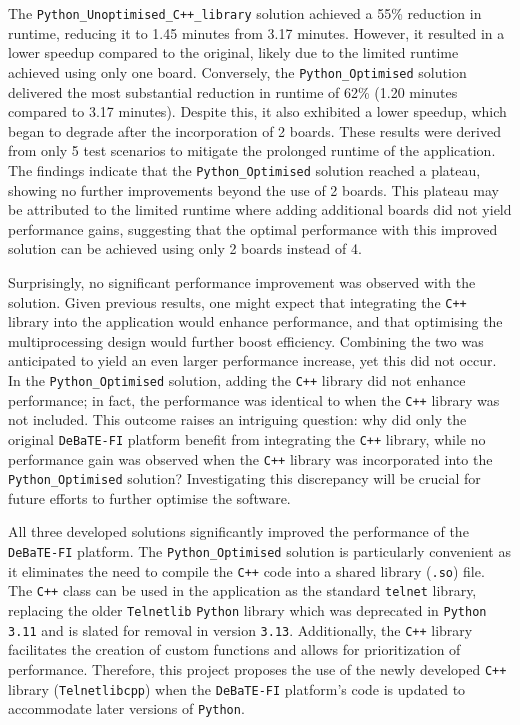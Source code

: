 The \texttt{Python\_Unoptimised\_C++\_library} solution achieved a 55\% reduction in runtime, reducing it to 1.45 minutes from 3.17 minutes. However, it resulted in a lower speedup compared to the original, likely due to the limited runtime achieved using only one board. Conversely, the \texttt{Python\_Optimised} solution delivered the most substantial reduction in runtime of 62\% (1.20 minutes compared to 3.17 minutes). Despite this, it also exhibited a lower speedup, which began to degrade after the incorporation of 2 boards. These results were derived from only 5 test scenarios to mitigate the prolonged runtime of the application. The findings indicate that the \texttt{Python\_Optimised} solution reached a plateau, showing no further improvements beyond the use of 2 boards. This plateau may be attributed to the limited runtime where adding additional boards did not yield performance gains, suggesting that the optimal performance with this improved solution can be achieved using only 2 boards instead of 4.

Surprisingly, no significant performance improvement was observed with the \texttt{} solution. Given previous results, one might expect that integrating the \texttt{C++} library into the application would enhance performance, and that optimising the multiprocessing design would further boost efficiency. Combining the two was anticipated to yield an even larger performance increase, yet this did not occur. In the \texttt{Python\_Optimised} solution, adding the \texttt{C++} library did not enhance performance; in fact, the performance was identical to when the \texttt{C++} library was not included. This outcome raises an intriguing question: why did only the original \texttt{DeBaTE-FI} platform benefit from integrating the \texttt{C++} library, while no performance gain was observed when the \texttt{C++} library was incorporated into the \texttt{Python\_Optimised} solution? Investigating this discrepancy will be crucial for future efforts to further optimise the software.

All three developed solutions significantly improved the performance of the \texttt{DeBaTE-FI} platform. The \texttt{Python\_Optimised} solution is particularly convenient as it eliminates the need to compile the \texttt{C++} code into a shared library (\texttt{.so}) file. The \texttt{C++} class can be used in the application as the standard \texttt{telnet} library, replacing the older \texttt{Telnetlib} \texttt{Python} library which was deprecated in \texttt{Python 3.11} and is slated for removal in version \texttt{3.13}\cite{PythonTelnetlib}. Additionally, the \texttt{C++} library facilitates the creation of custom functions and allows for prioritization of performance. Therefore, this project proposes the use of the newly developed \texttt{C++} library (\texttt{Telnetlibcpp}) when the \texttt{DeBaTE-FI} platform's code is updated to accommodate later versions of \texttt{Python}.

